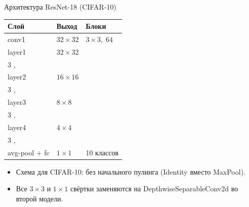 \documentclass[11pt,aspectratio=169]{beamer}
\begin{document}
\begin{frame}{Архитектура ResNet-18 (CIFAR-10)}
  \begin{center}
    \begin{tabular}{lll}
      \toprule
      \textbf{Слой}          & \textbf{Выход}       & \textbf{Блоки}            \\
      \midrule
      conv1                  & \(32 \times 32\)    & \(3 \times 3,\; 64\)      \\
      \addlinespace
      layer1                 & \(32 \times 32\)    & \(\begin{bmatrix}
                                                        3 \times 3,\; 64 \\
                                                        3 \times 3,\; 64
                                                      \end{bmatrix} \times 2\) \\
      \addlinespace
      layer2                 & \(16 \times 16\)    & \(\begin{bmatrix}
                                                        3 \times 3,\; 128 \\
                                                        3 \times 3,\; 128
                                                      \end{bmatrix} \times 2\) \\
      \addlinespace
      layer3                 & \(8 \times 8\)      & \(\begin{bmatrix}
                                                        3 \times 3,\; 256 \\
                                                        3 \times 3,\; 256
                                                      \end{bmatrix} \times 2\) \\
      \addlinespace
      layer4                 & \(4 \times 4\)      & \(\begin{bmatrix}
                                                        3 \times 3,\; 512 \\
                                                        3 \times 3,\; 512
                                                      \end{bmatrix} \times 2\) \\
      \addlinespace
      avg-pool + fc          & \(1 \times 1\)      & 10 классов                \\
      \bottomrule
    \end{tabular}
  \end{center}

  \begin{itemize}
    \item Схема для CIFAR-10: без начального пулинга (Identity вместо MaxPool).
    \item Все \(3 \times 3\) и \(1 \times 1\) свёртки заменяются на DepthwiseSeparableConv2d
          во второй модели.
  \end{itemize}
\end{frame}
\end{document}
